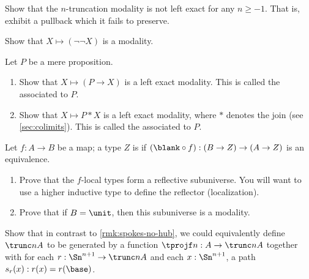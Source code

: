 \begin{ex}\label{ex:n-truncation-not-left-exact}
  Show that the $n$-truncation modality is not left exact for any $n\ge -1$.
  That is, exhibit a pullback which it fails to preserve.
\end{ex}

\begin{ex}\label{ex:double-negation-modality}
  Show that $X\mapsto (\neg\neg X)$ is a modality.%
\end{ex}

\begin{ex}\label{ex:prop-modalities}
  Let $P$ be a mere proposition.
  \begin{enumerate}
  \item Show that $X\mapsto (P\to X)$ is a left exact modality.
    This is called the 
    associated to $P$.
  \item Show that $X\mapsto P*X$ is a left exact modality, where $*$ denotes the join (see \cref{sec:colimits}).
    This is called the 
    associated to $P$.
  \end{enumerate}
\end{ex}

\begin{ex}\label{ex:f-local-type}
  Let $f:A\to B$ be a map; a type $Z$ is 
  if $(\blank\circ f):(B\to Z) \to (A\to Z)$ is an equivalence.
  \begin{enumerate}
  \item Prove that the $f$-local types form a reflective subuniverse.
    You will want to use a higher inductive type to define the reflector (localization).
  \item Prove that if $B=\unit$, then this subuniverse is a modality.
  \end{enumerate}
\end{ex}

\begin{ex}\label{ex:trunc-spokes-no-hub}
  Show that in contrast to \cref{rmk:spokes-no-hub}, we could equivalently define $\trunc nA$ to be generated by a function $\tprojf n : A \to \trunc n A$ together with for each $r:\Sn^{n+1} \to \trunc n A$ and each $x:\Sn^{n+1}$, a path $s_r(x):r(x) = r(\base)$.
\end{ex}

